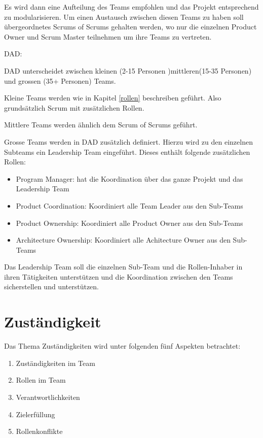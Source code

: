 Es wird  dann eine Aufteilung des Teams empfohlen und das Projekt entsprechend zu modularisieren. Um einen Austausch zwischen diesen Teams zu haben soll übergeordnetes Scrums of Scrums gehalten werden, wo nur die einzelnen Product Owner und Scrum Master teilnehmen um ihre Teams zu vertreten.
\bigskip 

{\Large DAD:} \cite{collabollabOrgLargerTeamsDad} \medskip

DAD unterscheidet zwischen kleinen (2-15 Personen )mittleren(15-35 Personen) und grossen (35+ Personen) Teams. \medskip

Kleine Teams werden wie in Kapitel \ref{rollen} beschreiben geführt. Also grundsätzlich Scrum mit zusätzlichen Rollen. \medskip

Mittlere Teams werden ähnlich dem Scrum of Scrums geführt.

Grosse Teams werden in DAD zusätzlich definiert. Hierzu wird zu den einzelnen Subteams ein Leadership Team eingeführt. Dieses enthält folgende zusätzlichen Rollen:
\begin{itemize}
	\item Program Manager: hat die Koordination über das ganze Projekt und das Leadership Team
	\item Product Coordination: Koordiniert alle Team Leader aus den Sub-Teams
	\item Product Ownership: Koordiniert alle Product Owner aus den Sub-Teams
	\item Architecture Ownership: Koordiniert alle Achitecture Owner aus den Sub-Teams
\end{itemize}

Das Leadership Team soll die einzelnen Sub-Team und die Rollen-Inhaber in ihren Tätigkeiten unterstützen und die Koordination zwischen den Teams sicherstellen und unterstützen. 

\section{Zuständigkeit}

Das Thema Zuständigkeiten wird unter folgenden fünf Aspekten betrachtet:
\begin{enumerate}
\item Zuständigkeiten im Team
\item Rollen im Team
\item Verantwortlichkeiten
\item Zielerfüllung
\item Rollenkonflikte
\end{enumerate}

